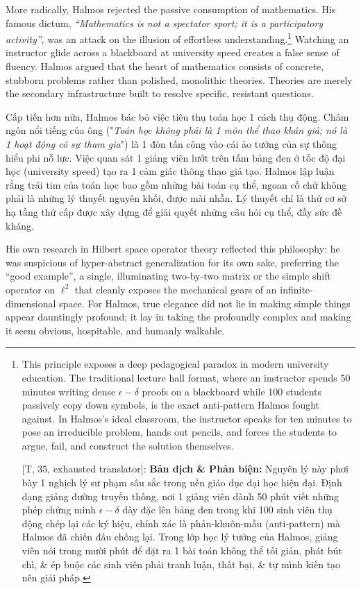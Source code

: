 \documentclass[11pt]{article}
\begin{document}
More radically, Halmos rejected the passive consumption of mathematics. His famous dictum, \textit{``Mathematics is not a spectator sport; it is a participatory activity''}, was an attack on the illusion of effortless understanding.\footnote{This principle exposes a deep pedagogical paradox in modern university education. The traditional lecture hall format, where an instructor spends 50 minutes writing dense $\epsilon-\delta$ proofs on a blackboard while 100 students passively copy down symbols, is the exact anti-pattern Halmos fought against. In Halmos's ideal classroom, the instructor speaks for ten minutes to pose an irreducible problem, hands out pencils, and forces the students to argue, fail, and construct the solution themselves.
	
	\textsf{[T, 35, exhausted translator]:} \textbf{Bản dịch \& Phản biện:} Nguyên lý này phơi bày 1 nghịch lý sư phạm sâu sắc trong nền giáo dục đại học hiện đại. Định dạng giảng đường truyền thống, nơi 1 giảng viên dành 50 phút viết những phép chứng minh $\epsilon-\delta$ dày đặc lên bảng đen trong khi 100 sinh viên thụ động chép lại các ký hiệu, chính xác là phản-khuôn-mẫu (anti-pattern) mà Halmos đã chiến đấu chống lại. Trong lớp học lý tưởng của Halmos, giảng viên nói trong mười phút để đặt ra 1 bài toán không thể tối giản, phát bút chì, \& ép buộc các sinh viên phải tranh luận, thất bại, \& tự mình kiến tạo nên giải pháp.} Watching an instructor glide across a blackboard at university speed creates a false sense of fluency. Halmos argued that the heart of mathematics consists of concrete, stubborn problems rather than polished, monolithic theories. Theories are merely the secondary infrastructure built to resolve specific, resistant questions.

Cấp tiến hơn nữa, Halmos bác bỏ việc tiêu thụ toán học 1 cách thụ động. Châm ngôn nổi tiếng của ông ("\textit{Toán học không phải là 1 môn thể thao khán giả; nó là 1 hoạt động có sự tham gia}") là 1 đòn tấn công vào cái ảo tưởng của sự thông hiểu phi nỗ lực. Việc quan sát 1 giảng viên lướt trên tấm bảng đen ở tốc độ đại học (university speed) tạo ra 1 cảm giác thông thạo giả tạo. Halmos lập luận rằng trái tim của toán học bao gồm những bài toán cụ thể, ngoan cố chứ không phải là những lý thuyết nguyên khối, được mài nhẵn. Lý thuyết chỉ là thứ cơ sở hạ tầng thứ cấp được xây dựng để giải quyết những câu hỏi cụ thể, đầy sức đề kháng.

His own research in Hilbert space operator theory reflected this philosophy: he was suspicious of hyper-abstract generalization for its own sake, preferring the ``good example'', a single, illuminating two-by-two matrix or the simple shift operator on $\ell^2$ that cleanly exposes the mechanical gears of an infinite-dimensional space. For Halmos, true elegance did not lie in making simple things appear dauntingly profound; it lay in taking the profoundly complex and making it seem obvious, hospitable, and humanly walkable.
\end{document}
